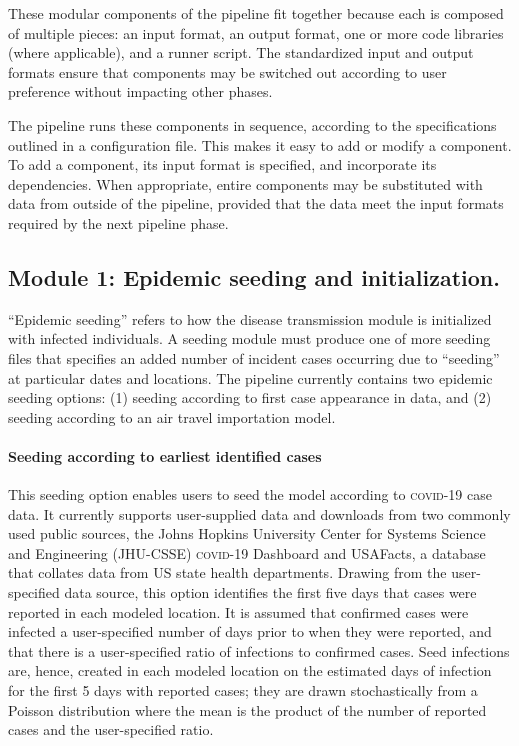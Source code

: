 These modular components of the pipeline fit together because each is composed of multiple pieces: an input format, an output format, one or more code libraries (where applicable), and a runner script. The standardized input and output formats ensure that components may be switched out according to user preference without impacting other phases. 

The pipeline runs these components in sequence, according to the specifications outlined in a configuration file. This makes it easy to add or modify a component. To add a component, its input format is specified, and incorporate its dependencies. When appropriate, entire components may be substituted with data from outside of the pipeline, provided that the data meet the input formats required by the next pipeline phase.

\subsection{Module 1: Epidemic seeding and initialization.} 

“Epidemic seeding” refers to how the disease transmission module is initialized with infected individuals. A seeding module must produce one of more seeding files that specifies an added number of incident cases occurring due to “seeding” at particular dates and locations. The pipeline currently contains two epidemic seeding options: (1) seeding according to first case appearance in data, and (2) seeding according to an air travel importation model. 

\paragraph{Seeding according to earliest identified cases} This seeding option enables users to seed the model according to \textsc{covid}-19 case data. It currently supports user-supplied data and downloads from two commonly used public sources, the Johns Hopkins University Center for Systems Science and Engineering (JHU-CSSE) \textsc{covid}-19 Dashboard\cite{Dong:InteractiveWebbasedDashboard:2020} and USAFacts, a database that collates data from US state health departments\cite{USAFacts:USCOVID19Cases:2021}. Drawing from the user-specified data source, this option identifies the first five days that cases were reported in each modeled location. It is assumed that confirmed cases were infected a user-specified number of days prior to when they were reported, and that there is a user-specified ratio of infections to confirmed cases. Seed infections are, hence, created in each modeled location on the estimated days of infection for the first 5 days with reported cases; they are drawn stochastically from a Poisson distribution where the mean is the product of the number of reported cases and the user-specified ratio. 

